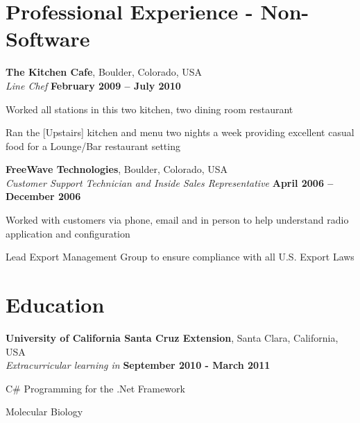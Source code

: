 \documentclass[margin,line]{resume}
\begin{document}
\begin{resume}
 \section{\mysidestyle Professional Experience - Non-Software}
   
 \textbf{The Kitchen Cafe}, Boulder, Colorado, USA \vspace{1mm}\\\vspace{1mm}%
    \textsl{Line Chef} \hfill \textbf{February 2009 -- July 2010} \vspace{-3mm}\\\vspace{-1mm}%
	\begin{list2}
	\item Worked all stations in this two kitchen, two dining room restaurant
	\item Ran the [Upstairs] kitchen and menu two nights a week providing excellent casual food for a Lounge/Bar restaurant setting
	\end{list2}

    \textbf{FreeWave Technologies}, Boulder, Colorado, USA \vspace{1mm}\\\vspace{1mm}%
    \textsl{Customer Support Technician and Inside Sales Representative} \hfill \textbf{April 2006 -- December 2006} \vspace{-3mm}\\\vspace{-1mm}%
	\begin{list2}
	\item Worked with customers via phone, email and in person to help understand radio application and configuration
	\item Lead Export Management Group to ensure compliance with all U.S. Export Laws
	\end{list2}

    \section{\mysidestyle Education}

    \textbf{University of California Santa Cruz Extension}, Santa Clara, California, USA \vspace{1mm}\\\vspace{1mm}%
    \textsl{Extracurricular learning in} \hfill \textbf{September 2010 - March 2011}\vspace{-3mm}\\\vspace{-1mm}%
    \begin{list2}
        \item C\# Programming for the .Net Framework
        \item Molecular Biology	
    \end{list2}\vspace{-1.5mm}


\end{resume}
\end{document}
